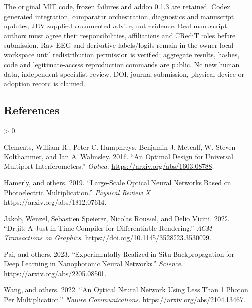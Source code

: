 \documentclass[
  10pt,
]{article}
\newlength{\cslhangindent}
\newenvironment{CSLReferences}[2] %
 {%
  \setlength{\parindent}{0pt}
  \ifodd #1 \everypar{\setlength{\hangindent}{\cslhangindent}}\ignorespaces\fi
  \ifnum #2 > 0
  \setlength{\parskip}{#2\baselineskip}
  \fi
 }%
 {}
\begin{document}
The original MIT code, frozen failures and addon 0.1.3 are retained.
Codex generated integration, comparator orchestration, diagnostics and
manuscript updates; JEV supplied documented advice, not evidence. Real
manuscript authors must agree their responsibilities, affiliations and
CRediT roles before submission. Raw EEG and derivative labels/logits
remain in the owner local workspace until redistribution permission is
verified; aggregate results, hashes, code and legitimate-access
reproduction commands are public. No new human data, independent
specialist review, DOI, journal submission, physical device or adoption
record is claimed.

\hypertarget{references}{%
\subsection*{References}\label{references}}

\hypertarget{refs}{}
\begin{CSLReferences}{1}{0}
\leavevmode{}%
Clements, William R., Peter C. Humphreys, Benjamin J. Metcalf, W. Steven
Kolthammer, and Ian A. Walmsley. 2016. {``An Optimal Design for
Universal Multiport Interferometers.''} \emph{Optica}.
\url{https://arxiv.org/abs/1603.08788}.

\leavevmode{}%
Hamerly, and others. 2019. {``Large-Scale Optical Neural Networks Based
on Photoelectric Multiplication.''} \emph{Physical Review X}.
\url{https://arxiv.org/abs/1812.07614}.

\leavevmode{}%
Jakob, Wenzel, Sebastien Speierer, Nicolas Roussel, and Delio Vicini.
2022. {``Dr.jit: A Just-in-Time Compiler for Differentiable
Rendering.''} \emph{ACM Transactions on Graphics}.
\url{https://doi.org/10.1145/3528223.3530099}.

\leavevmode{}%
Pai, and others. 2023. {``Experimentally Realized in Situ
Backpropagation for Deep Learning in Nanophotonic Neural Networks.''}
\emph{Science}. \url{https://arxiv.org/abs/2205.08501}.

\leavevmode{}%
Wang, and others. 2022. {``An Optical Neural Network Using Less Than 1
Photon Per Multiplication.''} \emph{Nature Communications}.
\url{https://arxiv.org/abs/2104.13467}.

\end{CSLReferences}
\end{document}
